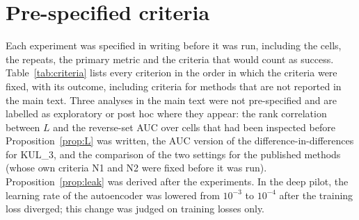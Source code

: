 

\section{Pre-specified criteria}\label{app:criteria}

Each experiment was specified in writing before it was run, including the cells, the repeats, the primary metric and the criteria that would count as success. Table~\ref{tab:criteria} lists every criterion in the order in which the criteria were fixed, with its outcome, including criteria for methods that are not reported in the main text. Three analyses in the main text were not pre-specified and are labelled as exploratory or post hoc where they appear: the rank correlation between $L$ and the reverse-set AUC over cells that had been inspected before Proposition~\ref{prop:L} was written, the AUC version of the difference-in-differences for KUL\_3, and the comparison of the two settings for the published methods (whose own criteria N1 and N2 were fixed before it was run). Proposition~\ref{prop:leak} was derived after the experiments. In the deep pilot, the learning rate of the autoencoder was lowered from $10^{-3}$ to $10^{-4}$ after the training loss diverged; this change was judged on training losses only.

